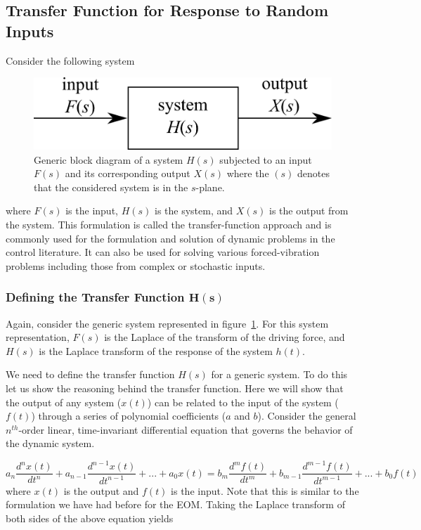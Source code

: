 \documentclass[12pt,letter]{article}
\begin{document}
\subsection{Transfer Function for Response to Random Inputs}

			Consider the following system
			\begin{figure}[H]
				\centering
				\includegraphics[]{../figures/transfer_function_system.png}
				\caption{Generic block diagram of a system $H(s)$ subjected to an input $F(s)$ and its corresponding output $X(s)$ where the $(s)$ denotes that the considered system is in the $s$-plane.}
				\label{fig:transfer_function_system}
			\end{figure}
			\noindent where $F(s)$ is the input, $H(s)$ is the system, and $X(s)$ is the output from the system. This formulation is called the transfer-function approach and is commonly used for the formulation and solution of dynamic problems in the control literature. It can also be used for solving various forced-vibration problems including those from complex or stochastic inputs. 
	
\subsubsection{Defining the Transfer Function $\mathbf{H(s)}$}

Again, consider the generic system represented in figure~\ref{fig:transfer_function_system}. For this system representation, $F(s)$ is the Laplace of the transform of the driving force, and $H(s)$ is the Laplace transform of the response of the system $h(t)$. 

We need to define the transfer function $H(s)$ for a generic system. To do this let us show the reasoning behind the transfer function. Here we will show that the output of any system ($x(t)$) can be related to the input of the system ($f(t)$) through a series of polynomial coefficients ($a$ and $b$). Consider the general $n^{th}$-order linear, time-invariant differential equation that governs the behavior of the dynamic system.

\begin{equation}
a_n\frac{d^nx(t)}{dt^n} + a_{n-1}\frac{d^{n-1}x(t)}{dt^{n-1}} + ... + a_0x(t) = b_m\frac{d^mf(t)}{dt^m} + b_{m-1}\frac{d^{m-1}f(t)}{dt^{m-1}} + ... + b_0f(t)
\end{equation} 
where $x(t)$ is the output and $f(t)$ is the input. Note that this is similar to the formulation we have had before for the EOM. Taking the Laplace transform of both sides of the above equation yields
\end{document}

